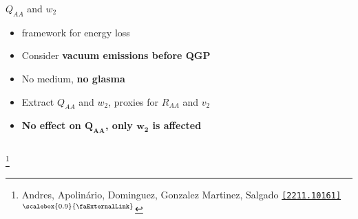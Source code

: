 \documentclass[aspectratio=169,11pt,usenames,dvipsnames]{beamer}
\renewcommand{\thefootnote}{\color{customblue}\faPaperPlaneO}
\newcommand\blfootnote[1]{%
  \begingroup
  \renewcommand\thefootnote{}\footnote{#1}%
  \addtocounter{footnote}{-1}%
  \endgroup
}
\begin{document}
\begin{frame}[t,noframenumbering]
\begin{columns}[onlytextwidth,t]
\begin{center}
            {\Large\color{isgold} $Q_{AA}$ and $w_2$ \\[10pt]}
            \footnotesize
                \begin{itemize}
                    \item {\color{lightgray}{\bfseries BDMPS-Z} framework for energy loss}
                    \item {\color{lightgray}Consider {\bfseries vacuum emissions before QGP}}
                    \item {\color{lightgray}No medium, {\bfseries no glasma}}
                    \item {\color{lightgray}Extract $Q_{AA}$ and $w_2$, proxies for $R_{AA}$ and $v_2$}
                    \item {\color{lightgray}\bfseries No effect on $\boldsymbol{Q_{AA}}$, only $\boldsymbol{w_2}$ is affected}
                \end{itemize}
        \end{center}
    \end{columns}
    \blfootnote{\scriptsize Andres, Apolinário, Dominguez, Gonzalez Martinez, Salgado \href{https://arxiv.org/abs/2211.10161}{\color{palgold}\texttt{[2211.10161]}$^\text{\scalebox{0.9}{\faExternalLink}}$}}
\end{frame}


\end{document}
